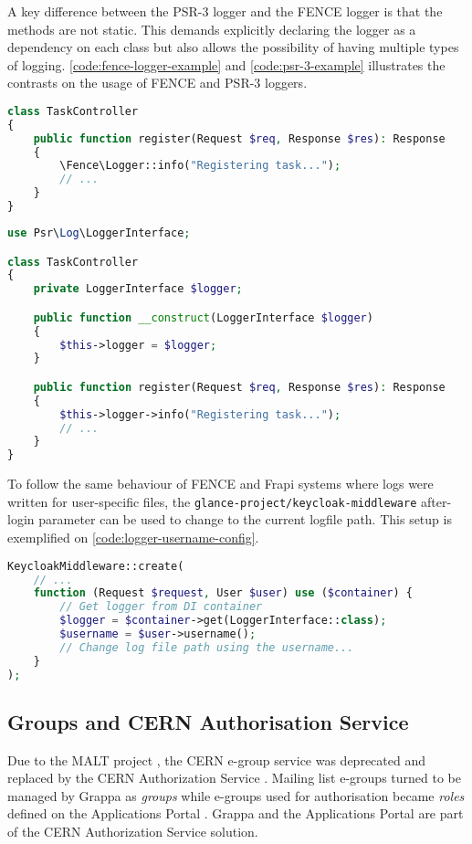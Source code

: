 A key difference between the PSR-3 logger and the FENCE logger is that the methods are not static. This demands explicitly declaring the logger as a dependency on each class but also allows the possibility of having multiple types of logging. \autoref{code:fence-logger-example} and \autoref{code:psr-3-example} illustrates the contrasts on the usage of FENCE and PSR-3 loggers.

\begin{lstlisting}[language=PHP,label={code:fence-logger-example},caption={TODO}]
class TaskController
{
	public function register(Request $req, Response $res): Response
	{
		\Fence\Logger::info("Registering task...");
		// ...
	}
}
\end{lstlisting}

\begin{lstlisting}[language=PHP,label={code:psr-3-example},caption={TODO}]
use Psr\Log\LoggerInterface;

class TaskController
{
	private LoggerInterface $logger;

	public function __construct(LoggerInterface $logger)
	{
		$this->logger = $logger;
	}

	public function register(Request $req, Response $res): Response
	{
		$this->logger->info("Registering task...");
		// ...
	}
}
\end{lstlisting}

To follow the same behaviour of FENCE and Frapi systems where logs were written for user-specific files, the \texttt{glance-project/keycloak-middleware} after-login parameter can be used to change to the current logfile path. This setup is exemplified on \autoref{code:logger-username-config}.

\begin{lstlisting}[language=PHP,label={code:logger-username-config},caption={TODO}]
KeycloakMiddleware::create(
	// ...
	function (Request $request, User $user) use ($container) {
		// Get logger from DI container
		$logger = $container->get(LoggerInterface::class);
		$username = $user->username();
		// Change log file path using the username...
	}
);
\end{lstlisting}

\subsection{Groups and CERN Authorisation Service}

Due to the MALT project \cite{malt}, the CERN e-group service was deprecated and replaced by the CERN Authorization Service \cite{cern-authorization-service}. Mailing list e-groups turned to be managed by Grappa \cite{grappa-website} as \textit{groups} while e-groups used for authorisation became \textit{roles} defined on the Applications Portal \cite{applications-portal}. Grappa and the Applications Portal are part of the CERN Authorization Service solution.


